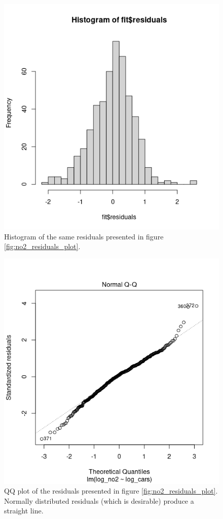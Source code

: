 \documentclass[a4paper, twocolumn]{article}
\begin{document}
\begin{figure}[h!]
    \centering
    \includegraphics[width=0.7\linewidth]{figures/no2_residuals_hist.png}
    \caption{Histogram of the same residuals presented in figure \ref{fig:no2_residuals_plot}.}
    \label{fig:no2_residuals_hist}
\end{figure}

\begin{figure}[h!]
    \centering
    \includegraphics[width=0.7\linewidth]{figures/no2_residuals_QQ.png}
    \caption{QQ plot of the residuals presented in figure \ref{fig:no2_residuals_plot}. Normally distributed residuals (which is desirable) produce a straight line.}
    \label{fig:no2_residuals_QQ}
\end{figure}
\end{document}
